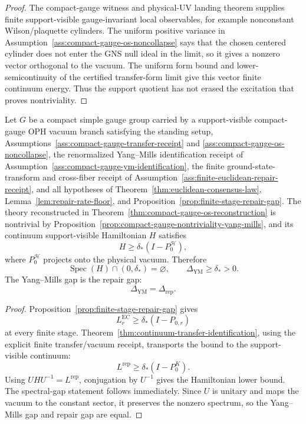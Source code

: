 \begin{proof}
The compact-gauge witness and physical-UV landing theorem supplies finite support-visible
gauge-invariant local observables, for example nonconstant Wilson/plaquette cylinders. The uniform
positive variance in Assumption~\ref{ass:compact-gauge-os-noncollapse} says that the chosen
centered cylinder does not enter the GNS null ideal in the limit, so it gives a nonzero vector
orthogonal to the vacuum. The uniform form bound and lower-semicontinuity of the certified
transfer-form limit give this vector finite continuum energy. Thus the support quotient has not
erased the excitation that proves nontriviality.
\end{proof}

\begin{theorem}
\label{thm:oph-yang-mills-gap}
Let \(G\) be a compact simple gauge group carried by a support-visible compact-gauge OPH vacuum
branch satisfying the standing setup, Assumptions~\ref{ass:compact-gauge-transfer-receipt} and
\ref{ass:compact-gauge-os-noncollapse}, the renormalized Yang--Mills identification receipt
of Assumption~\ref{ass:compact-gauge-ym-identification}, the finite ground-state-transform and cross-fiber receipt
of Assumption~\ref{ass:finite-euclidean-repair-receipt}, and all hypotheses of
Theorem~\ref{thm:euclidean-consensus-law},
Lemma~\ref{lem:repair-rate-floor}, and
Proposition~\ref{prop:finite-stage-repair-gap}. The theory reconstructed in
Theorem~\ref{thm:compact-gauge-os-reconstruction} is nontrivial by
Proposition~\ref{prop:compact-gauge-nontriviality-yang-mills}, and its continuum support-visible
Hamiltonian \(H\)
satisfies
\[
H\ge \delta_*(I-P_0^{\mathcal H}),
\]
where \(P_0^{\mathcal H}\) projects onto the physical vacuum. Therefore
\[
\operatorname{Spec}(H)\cap(0,\delta_*)=\varnothing,
\qquad
\Delta_{\mathrm{YM}}\ge \delta_*>0.
\]
The Yang--Mills gap is the repair gap:
\[
\Delta_{\mathrm{YM}}=\Delta_{\mathrm{rep}}.
\]
\end{theorem}

\begin{proof}
Proposition~\ref{prop:finite-stage-repair-gap} gives
\[
L_r^{\mathrm{EC}}\ge \delta_*(I-P_{0,r})
\]
at every finite stage. Theorem~\ref{thm:continuum-transfer-identification}, using the explicit
finite transfer/vacuum receipt, transports the bound to the support-visible continuum:
\[
L^{\mathrm{rep}}\ge \delta_*(I-P_0^K).
\]
Using \(UHU^{-1}=L^{\mathrm{rep}}\), conjugation by \(U^{-1}\) gives the Hamiltonian lower bound.
The spectral-gap statement follows immediately. Since \(U\) is unitary and maps the vacuum to the
constant sector, it preserves the nonzero spectrum, so the Yang--Mills gap and repair gap are
equal.
\end{proof}

